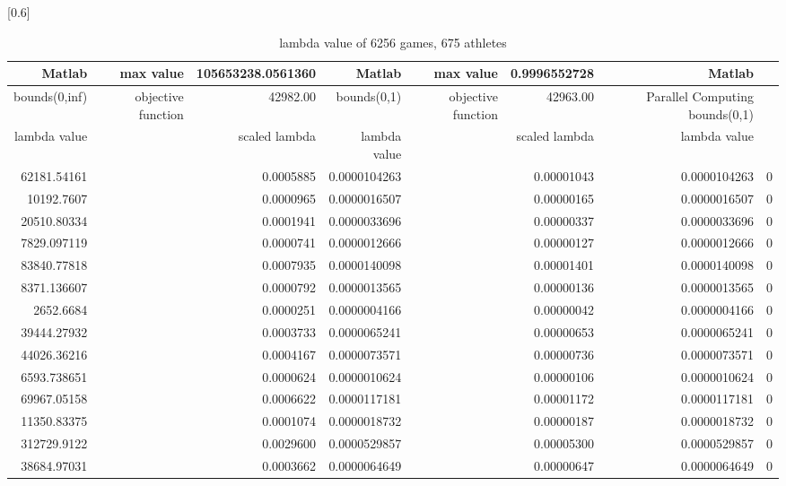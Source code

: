 \documentclass[
journal=jacsat, %
manuscript=article]{achemso}
\begin{document}
\begin{table}[htbp]
  \centering
  \caption{lambda value of 6256 games, 675 athletes}
  \scalebox{0.6}[0.6]{%
    \begin{tabular}{rrrrrrrr}
    \toprule
        Matlab & max value & 105653238.0561360 & Matlab & max value & 0.9996552728 & Matlab \\
    \hline
    bounds(0,inf) & objective function & 42982.00 & bounds(0,1) & objective function & 42963.00 &  Parallel Computing bounds(0,1) \\
    \hline
    lambda value &       & scaled lambda & lambda value  &       & scaled lambda & lambda value  \\
    \bottomrule
    62181.54161 &       & 0.0005885 & 0.0000104263 &       & 0.00001043 & 0.0000104263 & 0 \\
    10192.7607 &       & 0.0000965 & 0.0000016507 &       & 0.00000165 & 0.0000016507 & 0 \\
    20510.80334 &       & 0.0001941 & 0.0000033696 &       & 0.00000337 & 0.0000033696 & 0 \\
    7829.097119 &       & 0.0000741 & 0.0000012666 &       & 0.00000127 & 0.0000012666 & 0 \\
    83840.77818 &       & 0.0007935 & 0.0000140098 &       & 0.00001401 & 0.0000140098 & 0 \\
    8371.136607 &       & 0.0000792 & 0.0000013565 &       & 0.00000136 & 0.0000013565 & 0 \\
    2652.6684 &       & 0.0000251 & 0.0000004166 &       & 0.00000042 & 0.0000004166 & 0 \\
    39444.27932 &       & 0.0003733 & 0.0000065241 &       & 0.00000653 & 0.0000065241 & 0 \\
    44026.36216 &       & 0.0004167 & 0.0000073571 &       & 0.00000736 & 0.0000073571 & 0 \\
    6593.738651 &       & 0.0000624 & 0.0000010624 &       & 0.00000106 & 0.0000010624 & 0 \\
    69967.05158 &       & 0.0006622 & 0.0000117181 &       & 0.00001172 & 0.0000117181 & 0 \\
    11350.83375 &       & 0.0001074 & 0.0000018732 &       & 0.00000187 & 0.0000018732 & 0 \\
    312729.9122 &       & 0.0029600 & 0.0000529857 &       & 0.00005300 & 0.0000529857 & 0 \\
    38684.97031 &       & 0.0003662 & 0.0000064649 &       & 0.00000647 & 0.0000064649 & 0 \\

\end{tabular}}
\end{table}
\end{document}
